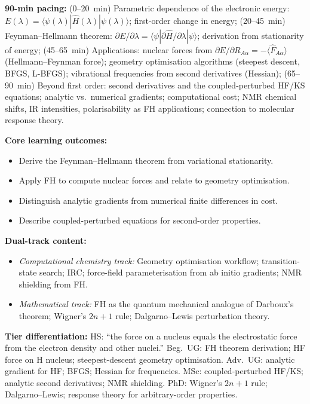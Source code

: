 \documentclass[11pt,a4paper]{article}
\begin{document}
\begin{tcolorbox}[chembox, title={Module~III.1 --- Lecture L03: Parametric Dependence and the Feynman--Hellmann Theorem}]
\textbf{90-min pacing:} (0--20~min) Parametric dependence of the electronic energy: $E(\lambda)=\langle\psi(\lambda)|\hat{H}(\lambda)|\psi(\lambda)\rangle$; first-order change in energy; (20--45~min) Feynman--Hellmann theorem: $\partial E/\partial\lambda=\langle\psi|\partial\hat{H}/\partial\lambda|\psi\rangle$; derivation from stationarity of energy; (45--65~min) Applications: nuclear forces from $\partial E/\partial R_{A\alpha}=-\langle\hat{F}_{A\alpha}\rangle$ (Hellmann--Feynman force); geometry optimisation algorithms (steepest descent, BFGS, L-BFGS); vibrational frequencies from second derivatives (Hessian); (65--90~min) Beyond first order: second derivatives and the coupled-perturbed HF/KS equations; analytic vs.\ numerical gradients; computational cost; NMR chemical shifts, IR intensities, polarisability as FH applications; connection to molecular response theory.

\medskip\textbf{Core learning outcomes:}
\begin{itemize}[leftmargin=1.4em,topsep=2pt,itemsep=1pt]
  \item Derive the Feynman--Hellmann theorem from variational stationarity.
  \item Apply FH to compute nuclear forces and relate to geometry optimisation.
  \item Distinguish analytic gradients from numerical finite differences in cost.
  \item Describe coupled-perturbed equations for second-order properties.
\end{itemize}

\medskip\textbf{Dual-track content:}
\begin{itemize}[leftmargin=1.4em,topsep=2pt,itemsep=1pt]
  \item \textit{Computational chemistry track:} Geometry optimisation workflow; transition-state search; IRC; force-field parameterisation from ab initio gradients; NMR shielding from FH.
  \item \textit{Mathematical track:} FH as the quantum mechanical analogue of Darboux's theorem; Wigner's $2n+1$ rule; Dalgarno--Lewis perturbation theory.
\end{itemize}

\medskip\textbf{Tier differentiation:}
HS: ``the force on a nucleus equals the electrostatic force from the electron density and other nuclei.''
Beg.\ UG: FH theorem derivation; HF force on H nucleus; steepest-descent geometry optimisation.
Adv.\ UG: analytic gradient for HF; BFGS; Hessian for frequencies.
MSc: coupled-perturbed HF/KS; analytic second derivatives; NMR shielding.
PhD: Wigner's $2n+1$ rule; Dalgarno--Lewis; response theory for arbitrary-order properties.


\end{tcolorbox}
\end{document}
